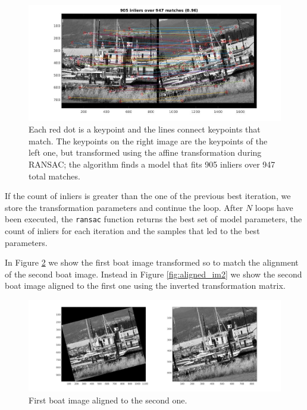 \documentclass[11pt]{article}
\begin{document}
\begin{figure}[htpb]
	\centering
	\includegraphics[width=1\textwidth]{imgs/transformed_matches.jpg}
	\caption{Each red dot is a keypoint and the lines connect keypoints that
	match. The keypoints on the right image are the keypoints of the left one, but
	transformed using the affine transformation during RANSAC; the algorithm finds
	a model that fits 905 inliers over 947 total matches.}
	\label{fig:ransac_inliers}
\end{figure}

If the count of inliers is greater than the one of the previous best iteration,
we store the transformation parameters and continue the loop. After $N$ loops
have been executed, the \texttt{ransac} function returns the best set of model
parameters, the count of inliers for each iteration and the samples that led to
the best parameters.

In Figure \ref{fig:aligned_im1} we show the first boat image transformed so to
match the alignment of the second boat image. Instead in Figure
\ref{fig:aligned_im2} we show the second boat image aligned to the first one
using the inverted transformation matrix.

\begin{figure}[htpb]
	\centering
	\includegraphics[width=1\textwidth]{imgs/aligned_im1.jpg}
	\caption{First boat image aligned to the second one.}
	\label{fig:aligned_im1}
\end{figure}
\end{document}
